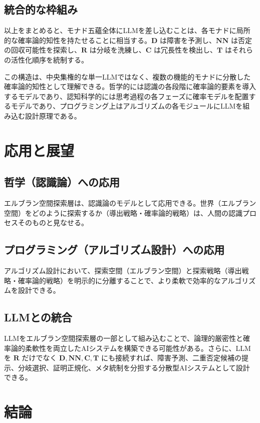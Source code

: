 \documentclass[11pt,a4paper]{ltjsarticle}
\theoremstyle{definition}
\newcommand{\Md}{\mathbf{D}}
\newcommand{\Mnn}{\mathbf{NN}}
\newcommand{\Mr}{\mathbf{R}}
\newcommand{\MC}{\mathbf{C}}
\newcommand{\MT}{\mathbf{T}}
\begin{document}
\subsection{統合的な枠組み}

以上をまとめると、モナド五蘊全体にLLMを差し込むことは、各モナドに局所的な確率論的知性を持たせることに相当する。$\Md$ は障害を予測し、$\Mnn$ は否定の回収可能性を探索し、$\Mr$ は分岐を洗練し、$\MC$ は冗長性を検出し、$\MT$ はそれらの活性化順序を統制する。

この構造は、中央集権的な単一LLMではなく、複数の機能的モナドに分散した確率論的知性として理解できる。哲学的には認識の各段階に確率論的要素を導入するモデルであり、認知科学的には思考過程の各フェーズに確率モデルを配置するモデルであり、プログラミング上はアルゴリズムの各モジュールにLLMを組み込む設計原理である。

\section{応用と展望}

\subsection{哲学（認識論）への応用}

エルブラン空間探索層は、認識論のモデルとして応用できる。世界（エルブラン空間）をどのように探索するか（導出戦略・確率論的戦略）は、人間の認識プロセスそのものと見なせる。

\subsection{プログラミング（アルゴリズム設計）への応用}

アルゴリズム設計において、探索空間（エルブラン空間）と探索戦略（導出戦略・確率論的戦略）を明示的に分離することで、より柔軟で効率的なアルゴリズムを設計できる。

\subsection{LLMとの統合}

LLMをエルブラン空間探索層の一部として組み込むことで、論理的厳密性と確率論的柔軟性を両立したAIシステムを構築できる可能性がある。さらに、LLMを $\Mr$ だけでなく $\Md, \Mnn, \MC, \MT$ にも接続すれば、障害予測、二重否定候補の提示、分岐選択、証明正規化、メタ統制を分担する分散型AIシステムとして設計できる。

\section{結論}
\end{document}

